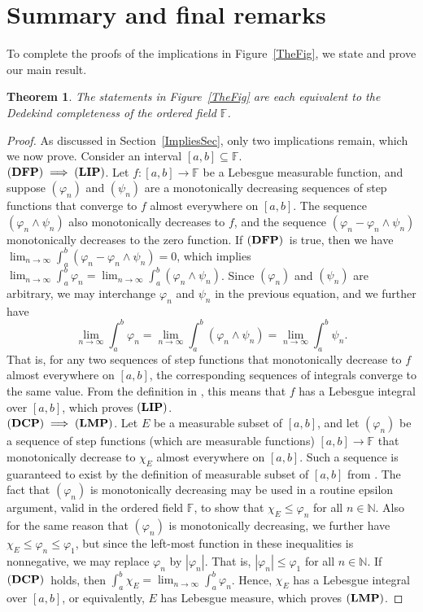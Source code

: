 \documentclass[10pt,a4paper]{amsart}
\newtheorem{theorem}{Theorem}[section]
\def\DCP{\ensuremath{{\bf(DCP_{A})}}}
\def\F{\mathbb{F}}
\def\N{\mathbb{N}}
\def\DCP{\ensuremath{{\bf(DCP)}}}
\def\DFP{\ensuremath{{\bf(DFP)}}}
\def\LIP{\ensuremath{{\bf(LIP)}}}
\def\LMP{\ensuremath{{\bf(LMP)}}}
\def\lbrak{\left[}
\def\rbrak{\right]}
\def\abClosed{\lbrak a,b\rbrak}
\def\into{\longrightarrow}
\def\sub{\subseteq}
\def\nseqlim{{\displaystyle\lim_{n\rightarrow\infty}}}
\begin{document}
\section{Summary and final remarks}

To complete the proofs of the implications in Figure~\ref{TheFig}, we state and prove our main result.


\begin{theorem} The statements in Figure~\ref{TheFig} are each equivalent to the Dedekind completeness of the ordered field $\F$.
\end{theorem}

\begin{proof} As discussed in Section~\ref{ImpliesSec}, only two implications remain, which we now prove. Consider an interval $\abClosed\sub\F$.\\

\noindent$\DFP\implies\LIP$. Let $f:\abClosed\into\F$ be a Lebesgue measurable function, and suppose $(\varphi_n)$ and $(\psi_n)$ are a monotonically decreasing sequences of step functions that converge to $f$ almost everywhere on $\abClosed$. The sequence $(\varphi_n\wedge\psi_n)$ also monotonically decreases to $f$, and the sequence $(\varphi_n-\varphi_n\wedge\psi_n)$ monotonically decreases to the zero function. If \DFP\ is true, then we have $\nseqlim\int_a^b(\varphi_n-\varphi_n\wedge\psi_n)=0$, which implies $\nseqlim\int_a^b\varphi_n=\nseqlim\int_a^b(\varphi_n\wedge\psi_n)$. Since $(\varphi_n)$ and $(\psi_n)$ are arbitrary, we may interchange $\varphi_n$ and $\psi_n$ in the previous equation, and we further have
\[\nseqlim\int_a^b\varphi_n=\nseqlim\int_a^b(\varphi_n\wedge\psi_n)=\nseqlim\int_a^b\psi_n.\]
That is, for any two sequences of step functions that monotonically decrease to $f$ almost everywhere on $\abClosed$, the corresponding sequences of integrals converge to the same value. From the definition in \cite[pp.~114--115]{can24}, this means that $f$ has a Lebesgue integral over $\abClosed$, which proves \LIP.\\ 


\noindent$\DCP\implies\LMP$. Let $E$ be a measurable subset of $\abClosed$, and let $(\varphi_n)$ be a sequence of step functions (which are measurable functions) $\abClosed\into\F$ that monotonically decrease to $\chi_E$ almost everywhere on $\abClosed$. Such a sequence is guaranteed to exist by the definition of measurable subset of $\abClosed$ from \cite[pp.~114--115]{can24}. The fact that $(\varphi_n)$ is monotonically decreasing may be used in a routine epsilon argument, valid in the ordered field $\F$, to show that $\chi_E\leq\varphi_n$ for all $n\in\N$. Also for the same reason that $(\varphi_n)$ is monotonically decreasing, we further have $\chi_E\leq \varphi_n\leq \varphi_1$, but since the left-most function in these inequalities is nonnegative, we may replace $\varphi_n$ by $|\varphi_n|$. That is, $|\varphi_n|\leq \varphi_1$ for all $n\in\N$. If \DCP\  holds, then $\int_a^b\chi_E=\nseqlim\int_a^b\varphi_n$. Hence, $\chi_E$ has a Lebesgue integral over $\abClosed$, or equivalently, $E$ has Lebesgue measure, which proves \LMP.
\end{proof}
\end{document}
